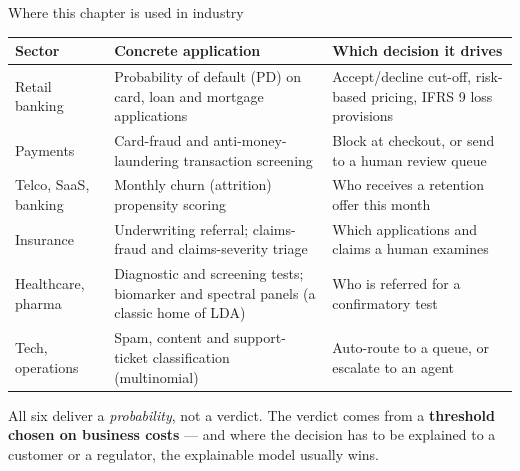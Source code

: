 \documentclass[aspectratio=169,11pt]{beamer}
\begin{document}
\begin{frame}{Where this chapter is used in industry}
  \scriptsize
  \begin{center}
  \begin{tabular}{@{}p{2.5cm}p{5.0cm}p{5.4cm}@{}}
    \toprule
    \textbf{Sector} & \textbf{Concrete application} & \textbf{Which decision it drives} \\
    \midrule
    Retail banking &
      Probability of default (PD) on card, loan and mortgage applications &
      Accept/decline cut-off, risk-based pricing, IFRS 9 loss provisions \\
    Payments &
      Card-fraud and anti-money-laundering transaction screening &
      Block at checkout, or send to a human review queue \\
    Telco, SaaS, banking &
      Monthly churn (attrition) propensity scoring &
      Who receives a retention offer this month \\
    Insurance &
      Underwriting referral; claims-fraud and claims-severity triage &
      Which applications and claims a human examines \\
    Healthcare, pharma &
      Diagnostic and screening tests; biomarker and spectral panels (a classic home of LDA) &
      Who is referred for a confirmatory test \\
    Tech, operations &
      Spam, content and support-ticket classification (multinomial) &
      Auto-route to a queue, or escalate to an agent \\
    \bottomrule
  \end{tabular}
  \end{center}
  \vspace{2pt}
  \begin{industry}
    All six deliver a \emph{probability}, not a verdict. The verdict comes from a
    \textbf{threshold chosen on business costs} --- and where the decision has to be
    explained to a customer or a regulator, the explainable model usually wins.
  \end{industry}
\end{frame}
\end{document}
